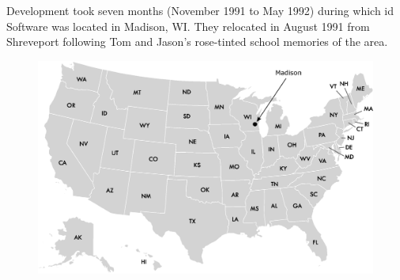 \documentclass[book.tex]{subfiles}
\begin{document}
Development took seven months (November 1991 to May 1992) during which id Software was located in Madison, WI. They relocated in August 1991 from Shreveport following Tom and Jason's rose-tinted school memories of the area.
\begin{figure}[H]
\centering
 \includegraphics[width=\textwidth]{imgs/drawings/map/usa-id-software.eps}
 \end{figure}
\end{document}
